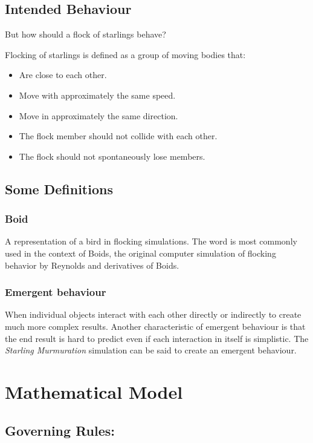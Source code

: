 \documentclass[12pt]{article}
\begin{document}
\subsection{Intended Behaviour}

But how should a flock of starlings behave?
\bigskip

Flocking of starlings is defined as a group of moving bodies that:

\begin{itemize}
    \item Are close to each other.
    \item Move with approximately the same speed.
 \item Move in approximately the same direction.
 \item The flock member should not collide with each other.
 \item The flock should not spontaneously lose members.
\end{itemize}

\subsection{Some Definitions}
\subsubsection{Boid}
A representation of a bird in flocking simulations. The word is most commonly used
in the context of Boids, the original computer simulation of flocking behavior by
Reynolds and derivatives of Boids.
\subsubsection{Emergent behaviour}
When individual objects interact with each other directly or indirectly to create
much more complex results. Another characteristic of emergent behaviour is that
the end result is hard to predict even if each interaction in itself is simplistic.
The \textit{Starling Murmuration} simulation can be said to create an emergent behaviour.


\section{Mathematical Model}

\subsection{Governing Rules:}
\end{document}
